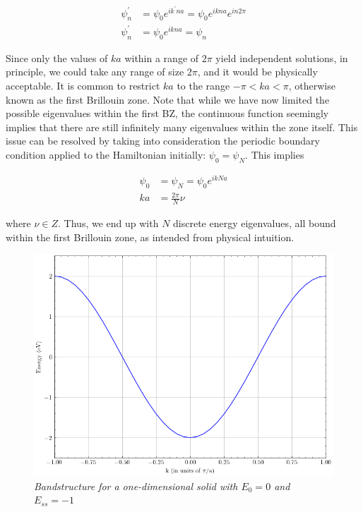 \begin{equation*}
\begin{aligned}
    \psi_{n}^{'} &= \psi_{0}e^{ik^{'}na} = \psi_{0}e^{ikna}e^{in2\pi} \\
    \psi_{n}^{'} &= \psi_{0}e^{ikna} = \psi_{n}
\end{aligned}
\end{equation*}

Since only the values of $ka$ within a range of $2\pi$ yield independent solutions, in principle, we could take any range of size $2\pi$, and it would be physically acceptable. It is common to restrict $ka$ to the range $-\pi < ka < \pi$, otherwise known as the first Brillouin zone. Note that while we have now limited the possible eigenvalues within the first BZ, the continuous function seemingly implies that there are still infinitely many eigenvalues within the zone itself. This issue can be resolved by taking into consideration the periodic boundary condition applied to the Hamiltonian initially: $\psi_{0} = \psi_{N}$. This implies

\begin{equation*}
\begin{aligned}
    \psi_{0} &= \psi_{N} = \psi_{0}e^{ikNa} \\
    ka &= \frac{2\pi}{N}\nu
\end{aligned}  
\end{equation*}

where $\nu \in Z$. Thus, we end up with $N$ discrete energy eigenvalues, all bound within the first Brillouin zone, as intended from physical intuition.

\vspace{1cm}

\begin{figure}[h]
\centering
\includegraphics[scale=0.6]{1D_chain.png}
\caption{\textit{Bandstructure for a one-dimensional solid with $E_0 = 0$ and $E_{ss} = -1$}}
\end{figure}

